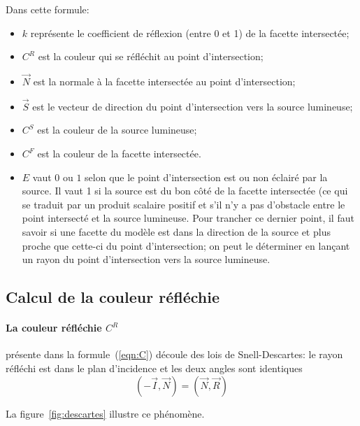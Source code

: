 \documentclass[10pt, a4paper ]{article}
\begin{document}
Dans cette formule:
\begin{itemize}
    \item $k$ représente le coefficient de réflexion (entre 0 et 1) de la
        facette intersectée;
    \item $C^R$ est la couleur qui se réfléchit au point d'intersection;
    \item $\overrightarrow{N}$ est la normale à la facette intersectée au point
        d'intersection;
    \item $\overrightarrow{S}$ est le vecteur de direction du point d'intersection vers la
        source lumineuse;
    \item $C^S$ est la couleur de la source lumineuse;
    \item $C^F$ est la couleur de la facette intersectée.
    \item $E$ vaut $0$ ou $1$ selon que le point d'intersection est ou non
        éclairé par la source. Il vaut 1 si la source est du bon côté de la
        facette intersectée (ce qui se traduit par un produit scalaire
        positif et s'il n'y a pas d'obstacle entre le point
        intersecté et la source lumineuse. Pour trancher ce dernier point, il
        faut savoir si une facette du modèle est dans la direction de la source
        et plus proche que cette-ci du point d'intersection; on peut le
        déterminer en lançant un rayon du point d'intersection vers la source
        lumineuse.
\end{itemize}

\subsection{Calcul de la couleur réfléchie}
\paragraph{La couleur réfléchie $C^R$} présente dans la formule~(\ref{eqn:C})
découle des lois de Snell-Descartes: le rayon réfléchi est dans le plan
d'incidence et les deux angles sont identiques
\begin{equation}
    \left( -\overrightarrow{I}, \overrightarrow{N} \right) = \left( \overrightarrow{N}, \overrightarrow{R} \right)
    \label{eqn:descartes}
\end{equation}

La figure~\ref{fig:descartes} illustre ce phénomène.
\end{document}
